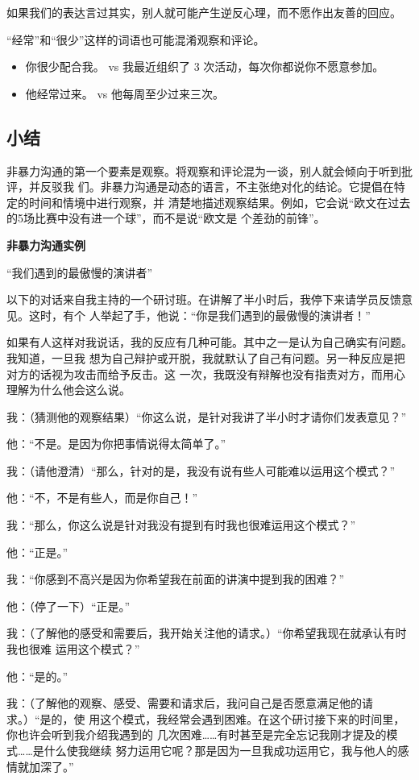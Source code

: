 \documentclass{ctexart}
\renewenvironment{quotation}{\setlength{\parskip}{0.5em}\setstretch{1.5}\kaishu\zihao{-5}\setlength{\parindent}{1em}}{\vspace{1em}}
\begin{document}
如果我们的表达言过其实，别人就可能产生逆反心理，而不愿作出友善的回应。

``经常''和``很少''这样的词语也可能混淆观察和评论。

\begin{itemize}
	\item 你很少配合我。 vs 我最近组织了 3 次活动，每次你都说你不愿意参加。
	\item 他经常过来。 vs 他每周至少过来三次。
\end{itemize}

\subsection{小结}

非暴力沟通的第一个要素是观察。将观察和评论混为一谈，别人就会倾向于听到批评，并反驳我
们。非暴力沟通是动态的语言，不主张绝对化的结论。它提倡在特定的时间和情境中进行观察，并
清楚地描述观察结果。例如，它会说``欧文在过去的5场比赛中没有进一个球''，而不是说``欧文是
个差劲的前锋''。

\textbf{非暴力沟通实例}

``我们遇到的最傲慢的演讲者''

以下的对话来自我主持的一个研讨班。在讲解了半小时后，我停下来请学员反馈意见。这时，有个
人举起了手，他说：``你是我们遇到的最傲慢的演讲者！''

如果有人这样对我说话，我的反应有几种可能。其中之一是认为自己确实有问题。我知道，一旦我
想为自己辩护或开脱，我就默认了自己有问题。另一种反应是把对方的话视为攻击而给予反击。这
一次，我既没有辩解也没有指责对方，而用心理解为什么他会这么说。


\begin{quotation}
	我：（猜测他的观察结果）``你这么说，是针对我讲了半小时才请你们发表意见？''

	他：``不是。是因为你把事情说得太简单了。''

	我：（请他澄清）``那么，针对的是，我没有说有些人可能难以运用这个模式？''

	他：``不，不是有些人，而是你自己！''

	我：``那么，你这么说是针对我没有提到有时我也很难运用这个模式？''

	他：``正是。''

	我：``你感到不高兴是因为你希望我在前面的讲演中提到我的困难？''

	他：（停了一下）``正是。''

	我：（了解他的感受和需要后，我开始关注他的请求。）``你希望我现在就承认有时我也很难
	运用这个模式？''

	他：``是的。''

	我：（了解他的观察、感受、需要和请求后，我问自己是否愿意满足他的请求。）``是的，使
	用这个模式，我经常会遇到困难。在这个研讨接下来的时间里，你也许会听到我介绍我遇到的
	几次困难\ldots\ldots 有时甚至是完全忘记我刚才提及的模式\ldots\ldots 是什么使我继续
	努力运用它呢？那是因为一旦我成功运用它，我与他人的感情就加深了。''
\end{quotation}
\end{document}
